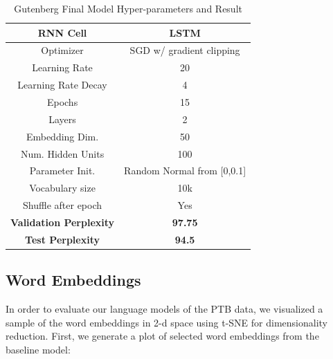 \documentclass[a4paper]{article}
\begin{document}
\begin{table}[H]
\centering
\begin{tabular}{|c | c|} 
 \hline
RNN Cell & LSTM\\ \hline
Optimizer & SGD w/ gradient clipping \\ \hline
Learning Rate & 20 \\ \hline
Learning Rate Decay & 4 \\ \hline
Epochs & 15\\ \hline
Layers & 2\\ \hline
Embedding Dim. & 50\\ \hline
Num. Hidden Units & 100\\ \hline
Parameter Init. & Random Normal from [0,0.1]\\ \hline
Vocabulary size & 10k\\ \hline
Shuffle after epoch & Yes \\ \hline
\textbf{Validation Perplexity} &\textbf{97.75} \\ \hline
\textbf{Test Perplexity} &\textbf{94.5} \\ \hline
\end{tabular}
\caption{Gutenberg Final Model Hyper-parameters and Result}
\label{table:1}
\end{table}

\subsection{Word Embeddings}
In order to evaluate our language models of the PTB data, we visualized a sample of the word embeddings in 2-d space using t-SNE for dimensionality reduction. First, we generate a plot of selected word embeddings from the baseline model:
\end{document}
